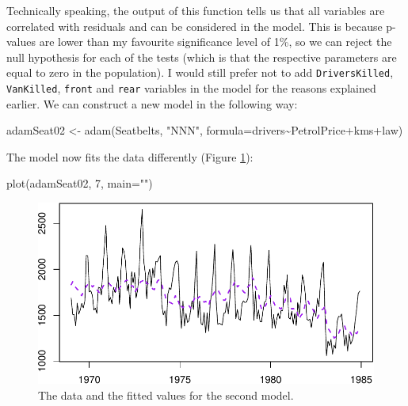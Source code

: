 \documentclass[
]{book}
\newenvironment{Shaded}{\begin{snugshade}}{\end{snugshade}}
\newcommand{\AttributeTok}[1]{\textcolor[rgb]{0.77,0.63,0.00}{#1}}
\newcommand{\DecValTok}[1]{\textcolor[rgb]{0.00,0.00,0.81}{#1}}
\newcommand{\FunctionTok}[1]{\textcolor[rgb]{0.00,0.00,0.00}{#1}}
\newcommand{\NormalTok}[1]{#1}
\newcommand{\OtherTok}[1]{\textcolor[rgb]{0.56,0.35,0.01}{#1}}
\newcommand{\SpecialCharTok}[1]{\textcolor[rgb]{0.00,0.00,0.00}{#1}}
\newcommand{\StringTok}[1]{\textcolor[rgb]{0.31,0.60,0.02}{#1}}
\theoremstyle{definition}
\theoremstyle{definition}
\theoremstyle{definition}
\theoremstyle{definition}
\theoremstyle{remark}
\begin{document}
Technically speaking, the output of this function tells us that all variables are correlated with residuals and can be considered in the model. This is because p-values are lower than my favourite significance level of 1\%, so we can reject the null hypothesis for each of the tests (which is that the respective parameters are equal to zero in the population). I would still prefer not to add \texttt{DriversKilled}, \texttt{VanKilled}, \texttt{front} and \texttt{rear} variables in the model for the reasons explained earlier. We can construct a new model in the following way:

\begin{Shaded}
\begin{Highlighting}[]
\NormalTok{adamSeat02 }\OtherTok{\textless{}{-}} \FunctionTok{adam}\NormalTok{(Seatbelts, }\StringTok{"NNN"}\NormalTok{,}
                   \AttributeTok{formula=}\NormalTok{drivers}\SpecialCharTok{\textasciitilde{}}\NormalTok{PetrolPrice}\SpecialCharTok{+}\NormalTok{kms}\SpecialCharTok{+}\NormalTok{law)}
\end{Highlighting}
\end{Shaded}

The model now fits the data differently (Figure \ref{fig:adamSeat02}):

\begin{Shaded}
\begin{Highlighting}[]
\FunctionTok{plot}\NormalTok{(adamSeat02, }\DecValTok{7}\NormalTok{, }\AttributeTok{main=}\StringTok{""}\NormalTok{)}
\end{Highlighting}
\end{Shaded}

\begin{figure}
\centering
\includegraphics{Svetunkov--2022----ADAM_files/figure-latex/adamSeat02-1.pdf}
\caption{\label{fig:adamSeat02}The data and the fitted values for the second model.}
\end{figure}
\end{document}
